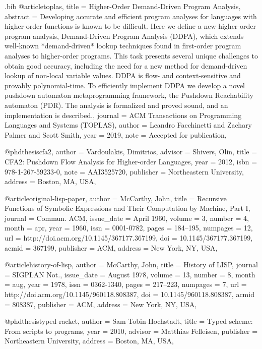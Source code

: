 \documentclass[12pt, oneside]{book}
\begin{document}
\begin{filecontents*}{\jobname.bib}
@article{toplas,
	title = {Higher-{Order} {Demand}-{Driven} {Program} {Analysis}},
	abstract = {Developing accurate and efficient program analyses for languages with higher-order functions is known to be difficult. Here we define a new higher-order program analysis, Demand-Driven Program Analysis (DDPA), which extends well-known *demand-driven* lookup techniques found in first-order program analyses to higher-order programs. This task presents several unique challenges to obtain good accuracy, including the need for a new method for demand-driven lookup of non-local variable values. DDPA is flow- and context-sensitive and provably polynomial-time. To efficiently implement DDPA we develop a novel pushdown automaton metaprogramming framework, the Pushdown Reachability automaton (PDR). The analysis is formalized and proved sound, and an implementation is described.},
	journal = {ACM Transactions on Programming Languages and Systems (TOPLAS)},
	author = {{Leandro Facchinetti} and {Zachary Palmer} and {Scott Smith}},
	year = {2019},
	note = {Accepted for publication},
}

@phdthesis{cfa2,
  author = {Vardoulakis, Dimitrios},
  advisor = {Shivers, Olin},
  title = {CFA2: Pushdown Flow Analysis for Higher-order Languages},
  year = {2012},
  isbn = {978-1-267-59233-0},
  note = {AAI3525720},
  publisher = {Northeastern University},
  address = {Boston, MA, USA},
}

@article{original-lisp-paper,
  author = {McCarthy, John},
  title = {Recursive Functions of Symbolic Expressions and Their Computation by Machine, Part I},
  journal = {Commun. ACM},
  issue_date = {April 1960},
  volume = {3},
  number = {4},
  month = apr,
  year = {1960},
  issn = {0001-0782},
  pages = {184--195},
  numpages = {12},
  url = {http://doi.acm.org/10.1145/367177.367199},
  doi = {10.1145/367177.367199},
  acmid = {367199},
  publisher = {ACM},
  address = {New York, NY, USA},
}

@article{history-of-lisp,
  author = {McCarthy, John},
  title = {History of LISP},
  journal = {SIGPLAN Not.},
  issue_date = {August 1978},
  volume = {13},
  number = {8},
  month = aug,
  year = {1978},
  issn = {0362-1340},
  pages = {217--223},
  numpages = {7},
  url = {http://doi.acm.org/10.1145/960118.808387},
  doi = {10.1145/960118.808387},
  acmid = {808387},
  publisher = {ACM},
  address = {New York, NY, USA},
}

@phdthesis{typed-racket,
  author = {Sam Tobin-Hochstadt},
  title = {Typed scheme: From scripts to programs},
  year = {2010},
  advisor = {Matthias Felleisen},
  publisher = {Northeastern University},
  address = {Boston, MA, USA},
}


\end{filecontents*}
\end{document}
